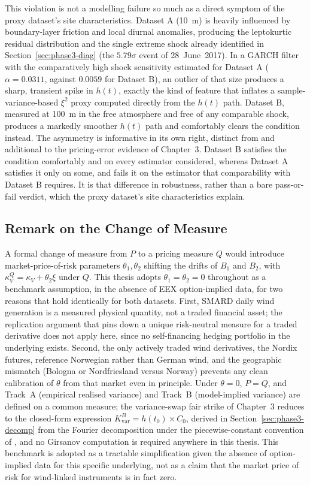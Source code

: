 \documentclass[11pt, a4paper, twoside]{article}
\begin{document}
This violation is not a modelling failure so much as a direct symptom of the proxy dataset's site characteristics. Dataset A (10~m) is heavily influenced by boundary-layer friction and local diurnal anomalies, producing the leptokurtic residual distribution and the single extreme shock already identified in Section~\ref{sec:phase3-diag} (the $5.79\sigma$ event of 28~June~2017). In a GARCH filter with the comparatively high shock sensitivity estimated for Dataset A ($\alpha = 0.0311$, against $0.0059$ for Dataset B), an outlier of that size produces a sharp, transient spike in $h(t)$, exactly the kind of feature that inflates a sample-variance-based $\xi^2$ proxy computed directly from the $h(t)$ path. Dataset B, measured at 100~m in the free atmosphere and free of any comparable shock, produces a markedly smoother $h(t)$ path and comfortably clears the condition instead. The asymmetry is informative in its own right, distinct from and additional to the pricing-error evidence of Chapter~3. Dataset B satisfies the condition comfortably and on every estimator considered, whereas Dataset A satisfies it only on some, and fails it on the estimator that comparability with Dataset B requires. It is that difference in robustness, rather than a bare pass-or-fail verdict, which the proxy dataset's site characteristics explain.

\subsection{Remark on the Change of Measure}
\label{sec:phase5-measure}

A formal change of measure from $P$ to a pricing measure $Q$ would introduce market-price-of-risk parameters $\theta_1, \theta_2$ shifting the drifts of $B_1$ and $B_2$, with $\kappa_V^Q = \kappa_V + \theta_2\xi$ under $Q$. This thesis adopts $\theta_1 = \theta_2 = 0$ throughout as a benchmark assumption, in the absence of EEX option-implied data, for two reasons that hold identically for both datasets. First, SMARD daily wind generation is a measured physical quantity, not a traded financial asset; the replication argument that pins down a unique risk-neutral measure for a traded derivative does not apply here, since no self-financing hedging portfolio in the underlying exists. Second, the only actively traded wind derivatives, the Nordix futures, reference Norwegian rather than German wind, and the geographic mismatch (Bologna or Nordfriesland versus Norway) prevents any clean calibration of $\theta$ from that market even in principle. Under $\theta = 0$, $P = Q$, and Track~A (empirical realised variance) and Track~B (model-implied variance) are defined on a common measure; the variance-swap fair strike of Chapter~3 reduces to the closed-form expression $K_{\text{var}}^B = h(t_0) \times C_0$, derived in Section~\ref{sec:phase3-decomp} from the Fourier decomposition under the piecewise-constant convention of \citet{Tol1997}, and no Girsanov computation is required anywhere in this thesis. This benchmark is adopted as a tractable simplification given the absence of option-implied data for this specific underlying, not as a claim that the market price of risk for wind-linked instruments is in fact zero.
\end{document}
